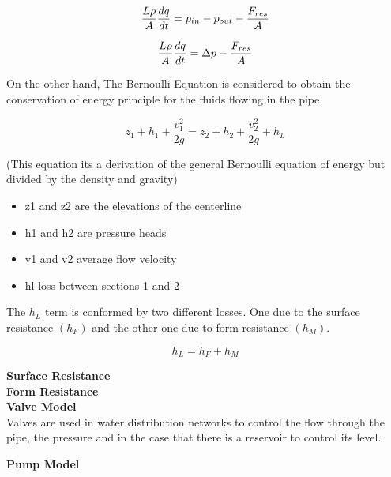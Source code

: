 \begin{equation}
    \frac{L \rho}{A} \frac{dq}{dt} =p_{in} - p_{out} - \frac{ F_{res}}{A} \\
\end{equation}

\begin{equation}
    \frac{L \rho}{A} \frac{dq}{dt} =\Delta p - \frac{ F_{res}}{A} \\
\end{equation}


On the other hand, The Bernoulli Equation is considered to obtain the conservation of energy principle for the fluids flowing in the pipe.

\begin{equation}
  \label{Bernoulliequation}
z_1 + h_1 + \frac{v_1^{2}}{2g} = z_2 + h_2 + \frac{v_2^{2}}{2g} + h_L
\end{equation}

(This equation its a derivation of the general Bernoulli equation of energy but divided by the density and 
gravity)\\

\begin{itemize}
  \item   z1 and z2 are the elevations of the centerline
  \item   h1 and h2 are pressure heads
  \item   v1 and v2 average flow velocity
  \item   hl loss between sections 1 and 2
\end{itemize}

The $h_L$ term is conformed by two different losses. One due to the surface resistance $(h_F)$ and the other one due to form resistance $(h_M)$. 

\begin{equation}
  h_L = h_F + h_M
\end{equation}

\textbf{Surface Resistance} \\ 

\textbf{Form Resistance} \\ 

\textbf{Valve Model}  \\
\label{ValveModel}
 Valves are used in water distribution networks to control the flow through the pipe, the pressure and in 
 the case that there is a reservoir to control its level. 
 
 \textbf{Pump Model} \\
 \label{PumpModel}
 
